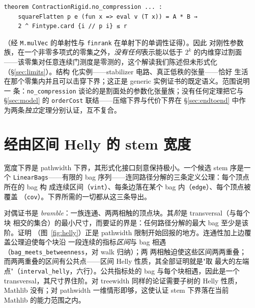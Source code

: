 \documentclass[11pt]{ctexart}
\begin{document}
\begin{lstlisting}
theorem ContractionRigid.no_compression ... :
    squareFlatten p e (fun x => eval v (T x)) = A * B →
    2 ^ Fintype.card {i // p i} ≤ r
\end{lstlisting}

\noindent （经 \texttt{M.mulVec} 的单射性与 \texttt{finrank} 在单射下的单调性证得）。因此
对刚性参数族，在一个非零多项式的零集之外，\emph{没有任何}表示能以低于 $2^k$ 的内维穿过割面
——该零集对任意连续门测度是零测的，这个解读我们陈述但未形式化（\S\ref{sec:limits}）。结构
化实例——stabilizer 电路、真正低秩的张量——恰好
生活在那个零集内并且可以击穿下界；这正是 generic 实例证书的既定语义。范围说明一
条：\texttt{no\_compression} 谈论的是割面处的参数化张量族；没有任何定理把它与
\S\ref{sec:model} 的 \texttt{orderCost} 联结——压缩下界与代价下界在
\S\ref{sec:endtoend} 中作为两条\emph{独立}定理分别认证，互不复合。

\section{经由区间 Helly 的 stem 宽度}\label{sec:bramble}

宽度下界是 pathwidth 下界，其形式化接口刻意保持极小。一个候选 stem 序是一个
\texttt{LinearBags}——有限的 bag 序列——连同路径分解的三条定义公理：每个顶点所在的 bag 构
成连续区间（\texttt{vint}）、每条边落在某个 bag 内（\texttt{edge}）、每个顶点被覆盖
（\texttt{cov}）。下界所需的一切都从这三条导出。

对偶证书是 \emph{bramble}：一族连通、两两相触的顶点块。其\emph{阶}是 transversal（与每个块
相交的集合）的最小尺寸，而要证的界是：任何路径分解的最大 bag 至少是该阶。证明
（图~\ref{fig:helly}）正是 pathwidth 限制开始回报的地方。连通性加上边覆盖公理迫使每个块沿
一段连续的指标\emph{区间}与 bag 相遇（\texttt{bag\_meets\_betweenness}，对 walk 归纳）；两
两相触迫使这些区间两两重叠；而两两重叠的区间有公共点——区间 Helly 性质，其全部证明就是"取
最大的左端点"（\texttt{interval\_helly}，六行）。公共指标处的 bag 与每个块相遇，因此是一个
transversal，其尺寸界住阶。对 treewidth 同样的论证需要子树的 Helly 性质，Mathlib 没有；对
pathwidth 一维情形即够，这使认证 stem 下界落在当前 Mathlib 的能力范围之内。
\end{document}
